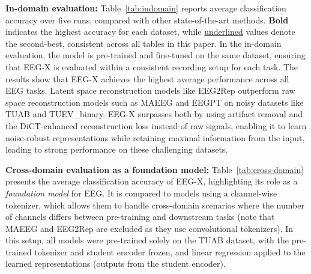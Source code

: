 \documentclass{article} %
\begin{document}
\textbf{In-domain evaluation:}
Table~\ref{tab:indomain} reports average classification accuracy over five runs, compared with other state-of-the-art methods. \textbf{Bold} indicates the highest accuracy for each dataset, while \underline{underlined} values denote the second-best, consistent across all tables in this paper. In the in-domain evaluation, the model is pre-trained and fine-tuned on the same dataset, ensuring that EEG-X is evaluated within a consistent recording setup for each task. The results show that EEG-X achieves the highest average performance across all EEG tasks. Latent space reconstruction models like EEG2Rep outperform raw space reconstruction models such as MAEEG and EEGPT on noisy datasets like TUAB and TUEV\_binary. EEG-X surpasses both by using artifact removal and the DiCT-enhanced reconstruction loss instead of raw signals, enabling it to learn noise-robust representations while retaining maximal information from the input, leading to strong performance on these challenging datasets.

\textbf{Cross-domain evaluation as a foundation model:}
Table~\ref{tab:cross-domain} presents the average classification accuracy of EEG-X, highlighting its role as a \emph{foundation model} for EEG. It is compared to models using a channel-wise tokenizer, which allows them to handle cross-domain scenarios where the number of channels differs between pre-training and downstream tasks (note that MAEEG and EEG2Rep are excluded as they use convolutional tokenizers). In this setup, all models were pre-trained solely on the TUAB dataset, with the pre-trained tokenizer and student encoder frozen, and linear regression applied to the learned representations (outputs from the student encoder).
\end{document}
